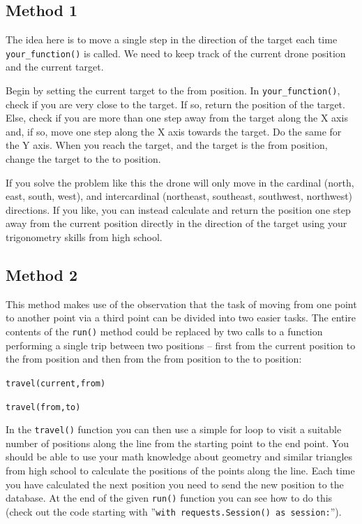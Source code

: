 \documentclass{article}
\begin{document}
\subsection{Method 1}

The idea here is to move a single step in the direction of the target each time \texttt{your\_function()} is called. We need to keep track of the current drone position and the current target.

Begin by setting the current target to the from position. In \texttt{your\_function()}, check if you are very close to the target. If so, return the position of the target. Else, check if you are more than one step away from the target along the X axis and, if so, move one step along the X axis towards the target. Do the same for the Y axis. When you reach the target, and the target is the from position, change the target to the to position.

If you solve the problem like this the drone will only move in the cardinal (north, east, south, west), and intercardinal (northeast, southeast, southwest, northwest) directions. If you like, you can instead calculate and return the position one step away from the current position directly in the direction of the target using your trigonometry skills from high school.


\subsection{Method 2}

This method makes use of the observation that the task of moving from one point to another point via a third point can be divided into two easier tasks. The entire contents of the \texttt{run()} method could be replaced by two calls to a function performing a single trip between two positions -- first from the current position to the from position and then from the from position to the to position:

\vspace{2mm}

\texttt{travel(current,from)}


\texttt{travel(from,to)}

\vspace{2mm}

In the \texttt{travel()} function you can then use a simple for loop to visit a suitable number of positions along the line from the starting point to the end point. You should be able to use your math knowledge about geometry and similar triangles from high school to calculate the positions of the points along the line. Each time you have calculated the next position you need to send the new position to the database. At the end of the given \texttt{run()} function you can see how to do this (check out the code starting with ''\texttt{with requests.Session() as session:}'').
\end{document}
